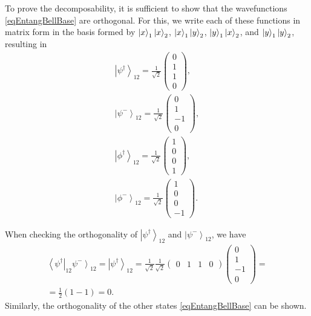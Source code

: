 To prove the decomposability, it is sufficient to show that the wavefunctions \eqref{eqEntangBellBase} are orthogonal. For this, we write each of these functions in matrix form in the basis formed by
$\ket{x}_1\ket{x}_2$, $\ket{x}_1\ket{y}_2$,
$\ket{y}_1\ket{x}_2$, and
$\ket{y}_1\ket{y}_2$, resulting in 
\begin{eqnarray}
  \left|\psi^{\dag}\right>_{12} = 
  \frac{1}{\sqrt{2}}
  \left(
  \begin{array}{c}
    0 \\
    1 \\
    1 \\
    0
  \end{array}
  \right),
  \nonumber \\
  \left|\psi^{-}\right>_{12} = 
  \frac{1}{\sqrt{2}}
  \left(
  \begin{array}{c}
    0 \\
    1 \\
    -1 \\
    0
  \end{array}
  \right),
  \nonumber \\
  \left|\phi^{\dag}\right>_{12} = 
  \frac{1}{\sqrt{2}}
  \left(
  \begin{array}{c}
    1 \\
    0 \\
    0 \\
    1
  \end{array}
  \right),
  \nonumber \\
  \left|\phi^{-}\right>_{12} = 
  \frac{1}{\sqrt{2}}
  \left(
  \begin{array}{c}
    1 \\
    0 \\
    0 \\
    -1
  \end{array}
  \right).
  \label{eqEntangBellBaseMatrix}
\end{eqnarray}

When checking the orthogonality of $\left|\psi^{\dag}\right>_{12}$ and 
$\left|\psi^{-}\right>_{12}$, we have
\begin{eqnarray}
\left<\psi^{\dag}\right|_{12}\left.\psi^{-}\right>_{12} = 
  \left|\psi^{\dag}\right>_{12} = 
  \frac{1}{\sqrt{2}} \frac{1}{\sqrt{2}}
  \left(
  \begin{array}{cccc}
    0 & 1 & 1 & 0
  \end{array}
  \right)   
  \left(
  \begin{array}{c}
    0 \\
    1 \\
    -1 \\
    0
  \end{array}
  \right) = 
\nonumber \\
=
  \frac{1}{2}\left(1 - 1\right) = 0.
\nonumber 
\end{eqnarray}
Similarly, the orthogonality of the other states
\eqref{eqEntangBellBase} can be shown. 

